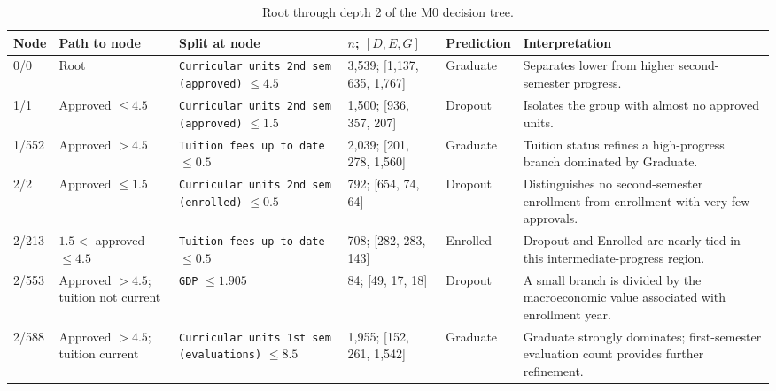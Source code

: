 \clearpage
\begin{table}[H]
  \centering
  \scriptsize
  \setlength{\tabcolsep}{2pt}
  \renewcommand{\arraystretch}{1.05}
  \caption{Root through depth 2 of the M0 decision tree.}
  \label{tab:e-levels-0-2}
  \begin{tabular}{@{}L{1.2cm}L{2.2cm}L{3.2cm}L{2.0cm}L{1.4cm}L{3.6cm}@{}}
    \toprule
    Node & Path to node & Split at node & $n$; $[D,E,G]$ & Prediction & Interpretation \\
    /0 & Root & \texttt{Curricular units 2nd sem (approved)} $\leq 4.5$
      & 3{,}539; [1{,}137, 635, 1{,}767] & Graduate
      & Separates lower from higher second-semester progress. \\
    1/1 & Approved $\leq 4.5$ & \texttt{Curricular units 2nd sem (approved)} $\leq 1.5$
      & 1{,}500; [936, 357, 207] & Dropout
      & Isolates the group with almost no approved units. \\
    1/552 & Approved $> 4.5$ & \texttt{Tuition fees up to date} $\leq 0.5$
      & 2{,}039; [201, 278, 1{,}560] & Graduate
      & Tuition status refines a high-progress branch dominated by Graduate. \\
    2/2 & Approved $\leq 1.5$ & \texttt{Curricular units 2nd sem (enrolled)} $\leq 0.5$
      & 792; [654, 74, 64] & Dropout
      & Distinguishes no second-semester enrollment from enrollment with very few approvals. \\
    2/213 & $1.5 <$ approved $\leq 4.5$ & \texttt{Tuition fees up to date} $\leq 0.5$
      & 708; [282, 283, 143] & Enrolled
      & Dropout and Enrolled are nearly tied in this intermediate-progress region. \\
    2/553 & Approved $>4.5$; tuition not current & \texttt{GDP} $\leq 1.905$
      & 84; [49, 17, 18] & Dropout
      & A small branch is divided by the macroeconomic value associated with enrollment year. \\
    2/588 & Approved $>4.5$; tuition current & \texttt{Curricular units 1st sem (evaluations)} $\leq 8.5$
      & 1{,}955; [152, 261, 1{,}542] & Graduate
      & Graduate strongly dominates; first-semester evaluation count provides further refinement. \\
    \bottomrule
  \end{tabular}
\end{table}

\vspace{0.4cm}


